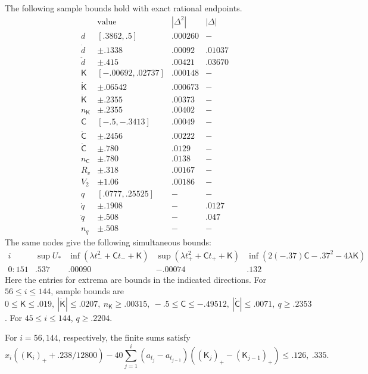 \begin{lemma}\label{lem:scalar-certificates}
The following sample bounds hold with exact rational endpoints.
\[
\begin{array}{c|c|c|c}
 &\text{value} & |\Delta^2| &|\Delta|\\ \hline
 d&[.3862,.5]&.000260&-\\
 \dot d&\pm.1338&.00092&.01037\\
 \ddot d&\pm.415&.00421&.03670\\
 \mathsf K&[-.00692,.02737]&.000148&-\\
 \dot{\mathsf K}&\pm.06542&.000673&-\\
 \ddot{\mathsf K}&\pm.2355&.00373&-\\
 n_{\mathsf K}&\pm.2355&.00402&-\\
 \mathsf C&[-.5,-.3413]&.00049&-\\
 \dot{\mathsf C}&\pm.2456&.00222&-\\
 \ddot{\mathsf C}&\pm.780&.0129&-\\
 n_{\mathsf C}&\pm.780&.0138&-\\
 R_v&\pm.318&.00167&-\\
 V_2&\pm1.06&.00186&-\\
 q&[.0777,.25525]&-&-\\
 \dot q&\pm.1908&-&.0127\\
 \ddot q&\pm.508&-&.047\\
 n_q&\pm.508&-&-
\end{array}
\]
The same nodes give the following simultaneous bounds:
\[
\begin{array}{c|cccc}
 i&\sup U_*&\inf(\lambda t_-^2+\mathsf Ct_-+\mathsf K)&\sup(\lambda t_+^2+\mathsf Ct_++\mathsf K)&
 \inf(2(-.37)\mathsf C-.37^2-4\lambda\mathsf K)\\\hline
 0{:}151&.537&.00090&-.00074&.132
\end{array}
\]
Here the entries for extrema are bounds in the indicated directions. For $56\le i\le144$, sample bounds are $0\le\mathsf K\le.019,\ |\dot{\mathsf K}|\le.0207,\ n_{\mathsf K}\ge.00315,\ -.5\le\mathsf C\le-.49512,\ |\dot{\mathsf C}|\le.0071,\ q\ge.2353$. For $45\le i\le144$, $q\ge.2204$.

For $i=56,144$, respectively, the finite sums satisfy
\[
 x_i ((\mathsf K_i)_+ + .238/12800) -
 40\sum_{j=1}^{i} (a_{t_j}-a_{t_{j-1}})((\mathsf K_j)_+-(\mathsf K_{j-1})_+)
 \le .126,\ .335 .
\]
\end{lemma}

